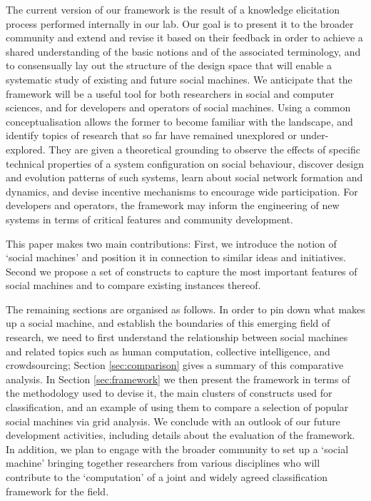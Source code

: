 \documentclass{sig-alternate}
\begin{document}
The current version of our framework is the result of a knowledge elicitation process performed internally in our lab. Our goal is to present it to the broader community and extend and revise it based on their feedback in order to achieve a shared understanding of the basic notions and of the associated terminology, and to consensually lay out the structure of the design space that will enable a systematic study of existing and future social machines. We anticipate that the framework will be a useful tool for both researchers in social and computer sciences, and for developers and operators of social machines. Using a common conceptualisation allows the former to become familiar with the landscape, and identify topics of research that so far have remained unexplored or under-explored. They are given a theoretical grounding to observe the effects of specific technical properties of a system configuration on social behaviour, discover design and evolution patterns of such systems, learn about social network formation and dynamics, and devise incentive mechanisms to encourage wide participation. For developers and operators, the framework may inform the engineering of new systems in terms of critical features and community development.

This paper makes two main contributions: First, we introduce the notion of `social machines' and position it in connection to similar ideas and initiatives. Second we propose a set of constructs to capture the most important features of social machines and to compare existing instances thereof.

The remaining sections are organised as follows. In order to pin down what makes up a social machine, and establish the boundaries of this emerging field of research, we need to first understand the relationship between social machines and related topics such as human computation, collective intelligence, and crowdsourcing; Section \ref{sec:comparison} gives a summary of this comparative analysis. In Section \ref{sec:framework} we then present the framework in terms of the methodology used to devise it, the main clusters of constructs used for classification, and an example of using them to compare a selection of popular social machines via grid analysis. We conclude with an outlook of our future development activities, including details about the evaluation of the framework. In addition, we plan to engage with the broader community to set up a `social machine' bringing together researchers from various disciplines who will contribute to the `computation' of a joint and widely agreed classification framework for the field.
\end{document}
